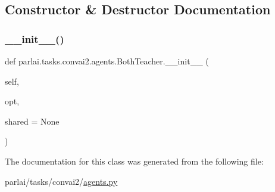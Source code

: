 \subsection{Constructor \& Destructor Documentation}
\mbox{\label{classparlai_1_1tasks_1_1convai2_1_1agents_1_1BothTeacher_acae96b99b1aa547acb06ee854936e50b}} 
\subsubsection{\texorpdfstring{\+\_\+\+\_\+init\+\_\+\+\_\+()}{\_\_init\_\_()}}
{\footnotesize\ttfamily def parlai.\+tasks.\+convai2.\+agents.\+Both\+Teacher.\+\_\+\+\_\+init\+\_\+\+\_\+ (\begin{DoxyParamCaption}\item[{}]{self,  }\item[{}]{opt,  }\item[{}]{shared = {\ttfamily None} }\end{DoxyParamCaption})}



The documentation for this class was generated from the following file\+:\begin{DoxyCompactItemize}
\item 
parlai/tasks/convai2/\hyperlink{parlai_2tasks_2convai2_2agents_8py}{agents.\+py}\end{DoxyCompactItemize}

